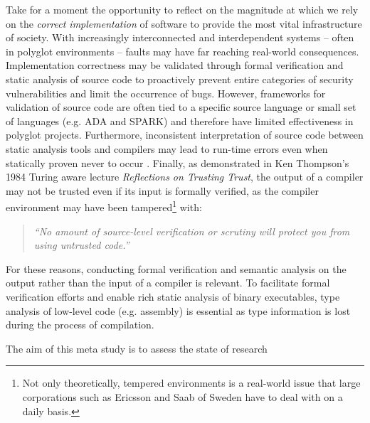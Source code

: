 \documentclass[10pt, a4paper, sigplan, authordraft]{acmart}
\begin{document}
Take for a moment the opportunity to reflect on the magnitude at which we rely on the \textit{correct implementation} of software to provide the most vital infrastructure of society. With increasingly interconnected and interdependent systems -- often in polyglot environments -- faults may have far reaching real-world consequences. Implementation correctness may be validated through formal verification and static analysis of source code to proactively prevent entire categories of security vulnerabilities and limit the occurrence of bugs. However, frameworks for validation of source code are often tied to a specific source language or small set of languages (e.g. ADA and SPARK) and therefore have limited effectiveness in polyglot projects. Furthermore, inconsistent interpretation of source code between static analysis tools and compilers may lead to run-time errors even when statically proven never to occur \cite{ada_static_analysis_and_compiler_inconsistencies}. Finally, as demonstrated in Ken Thompson's 1984 Turing aware lecture \textit{Reflections on Trusting Trust}, the output of a compiler may not be trusted even if its input is formally verified, as the compiler environment may have been tampered\footnote{Not only theoretically, tempered environments is a real-world issue that large corporations such as Ericsson and Saab of Sweden have to deal with on a daily basis.} with:

\begin{quote}
	\textit{``No amount of source-level verification or scrutiny will protect you from using untrusted code.''} \cite{trusting_trust}
\end{quote}

For these reasons, conducting formal verification and semantic analysis on the output rather than the input of a compiler is relevant. To facilitate formal verification efforts and enable rich static analysis of binary executables, type analysis of low-level code (e.g. assembly) is essential as type information is lost during the process of compilation.


The aim of this meta study is to assess the state of research


\end{document}
